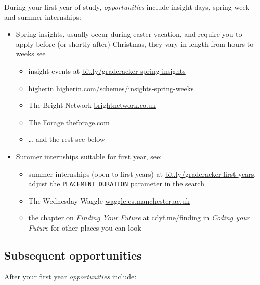 \documentclass[
]{book}
\providecommand{\tightlist}{%
  \setlength{\itemsep}{0pt}\setlength{\parskip}{0pt}}
\begin{document}
During your first year of study, \emph{opportunities} include insight days, spring week and summer internships:

\begin{itemize}
\tightlist
\item
  Spring insights, usually occur during easter vacation, and require you to apply before (or shortly after) Christmas, they vary in length from hours to weeks see

  \begin{itemize}
  \tightlist
  \item
    insight events at \href{https://bit.ly/gradcracker-spring-insights}{bit.ly/gradcracker-spring-insights}
  \item
    higherin \href{https://higherin.com/schemes/insights-spring-weeks}{higherin.com/schemes/insights-spring-weeks}
  \item
    The Bright Network \href{https://www.brightnetwork.co.uk/}{brightnetwork.co.uk}
  \item
    The Forage \href{https://www.theforage.com/}{theforage.com}
  \item
    \ldots{} and the rest see below
  \end{itemize}
\item
  Summer internships suitable for first year, see:

  \begin{itemize}
  \tightlist
  \item
    summer internships (open to first years) at \href{https://bit.ly/gradcracker-first-years}{bit.ly/gradcracker-first-years}, adjust the \texttt{PLACEMENT\ DURATION} parameter in the search
  \item
    The Wednesday Waggle \href{https://waggle.cs.manchester.ac.uk/}{waggle.cs.manchester.ac.uk}
  \item
    the chapter on \emph{Finding Your Future} at \href{https://www.cdyf.me/finding}{cdyf.me/finding} in \emph{Coding your Future} \citep{findingyourfuture} for other places you can look
  \end{itemize}
\end{itemize}

\subsection{Subsequent opportunities}\label{afterfirst}

After your first year \emph{opportunities} include:
\end{document}
